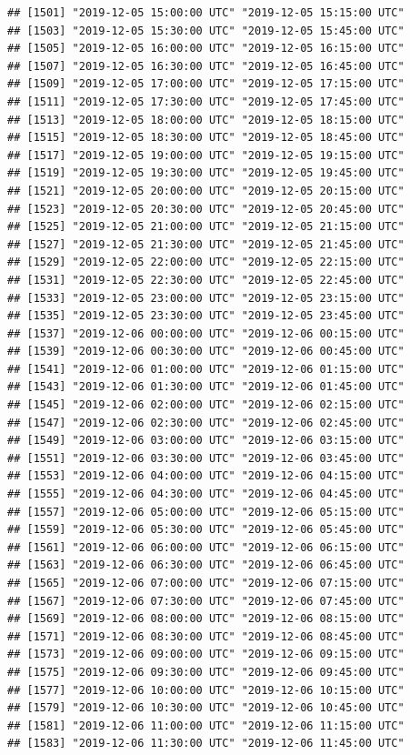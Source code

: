 \documentclass{article}\usepackage[]{graphicx}\usepackage[]{color}
\makeatletter
\newenvironment{kframe}{%
 \def\at@end@of@kframe{}%
 \ifinner\ifhmode%
  \def\at@end@of@kframe{\end{minipage}}%
  \begin{minipage}{\columnwidth}%
 \fi\fi%
 \def\FrameCommand##1{\hskip\@totalleftmargin \hskip-\fboxsep
 \colorbox{shadecolor}{##1}\hskip-\fboxsep
     \hskip-\linewidth \hskip-\@totalleftmargin \hskip\columnwidth}%
 \MakeFramed {\advance\hsize-\width
   \@totalleftmargin\z@ \linewidth\hsize
   \@setminipage}}%
 {\par\unskip\endMakeFramed%
 \at@end@of@kframe}
\newenvironment{knitrout}{}{} %
\makeatother
\begin{document}
\begin{knitrout}
\begin{kframe}
\begin{verbatim}
## [1501] "2019-12-05 15:00:00 UTC" "2019-12-05 15:15:00 UTC"
## [1503] "2019-12-05 15:30:00 UTC" "2019-12-05 15:45:00 UTC"
## [1505] "2019-12-05 16:00:00 UTC" "2019-12-05 16:15:00 UTC"
## [1507] "2019-12-05 16:30:00 UTC" "2019-12-05 16:45:00 UTC"
## [1509] "2019-12-05 17:00:00 UTC" "2019-12-05 17:15:00 UTC"
## [1511] "2019-12-05 17:30:00 UTC" "2019-12-05 17:45:00 UTC"
## [1513] "2019-12-05 18:00:00 UTC" "2019-12-05 18:15:00 UTC"
## [1515] "2019-12-05 18:30:00 UTC" "2019-12-05 18:45:00 UTC"
## [1517] "2019-12-05 19:00:00 UTC" "2019-12-05 19:15:00 UTC"
## [1519] "2019-12-05 19:30:00 UTC" "2019-12-05 19:45:00 UTC"
## [1521] "2019-12-05 20:00:00 UTC" "2019-12-05 20:15:00 UTC"
## [1523] "2019-12-05 20:30:00 UTC" "2019-12-05 20:45:00 UTC"
## [1525] "2019-12-05 21:00:00 UTC" "2019-12-05 21:15:00 UTC"
## [1527] "2019-12-05 21:30:00 UTC" "2019-12-05 21:45:00 UTC"
## [1529] "2019-12-05 22:00:00 UTC" "2019-12-05 22:15:00 UTC"
## [1531] "2019-12-05 22:30:00 UTC" "2019-12-05 22:45:00 UTC"
## [1533] "2019-12-05 23:00:00 UTC" "2019-12-05 23:15:00 UTC"
## [1535] "2019-12-05 23:30:00 UTC" "2019-12-05 23:45:00 UTC"
## [1537] "2019-12-06 00:00:00 UTC" "2019-12-06 00:15:00 UTC"
## [1539] "2019-12-06 00:30:00 UTC" "2019-12-06 00:45:00 UTC"
## [1541] "2019-12-06 01:00:00 UTC" "2019-12-06 01:15:00 UTC"
## [1543] "2019-12-06 01:30:00 UTC" "2019-12-06 01:45:00 UTC"
## [1545] "2019-12-06 02:00:00 UTC" "2019-12-06 02:15:00 UTC"
## [1547] "2019-12-06 02:30:00 UTC" "2019-12-06 02:45:00 UTC"
## [1549] "2019-12-06 03:00:00 UTC" "2019-12-06 03:15:00 UTC"
## [1551] "2019-12-06 03:30:00 UTC" "2019-12-06 03:45:00 UTC"
## [1553] "2019-12-06 04:00:00 UTC" "2019-12-06 04:15:00 UTC"
## [1555] "2019-12-06 04:30:00 UTC" "2019-12-06 04:45:00 UTC"
## [1557] "2019-12-06 05:00:00 UTC" "2019-12-06 05:15:00 UTC"
## [1559] "2019-12-06 05:30:00 UTC" "2019-12-06 05:45:00 UTC"
## [1561] "2019-12-06 06:00:00 UTC" "2019-12-06 06:15:00 UTC"
## [1563] "2019-12-06 06:30:00 UTC" "2019-12-06 06:45:00 UTC"
## [1565] "2019-12-06 07:00:00 UTC" "2019-12-06 07:15:00 UTC"
## [1567] "2019-12-06 07:30:00 UTC" "2019-12-06 07:45:00 UTC"
## [1569] "2019-12-06 08:00:00 UTC" "2019-12-06 08:15:00 UTC"
## [1571] "2019-12-06 08:30:00 UTC" "2019-12-06 08:45:00 UTC"
## [1573] "2019-12-06 09:00:00 UTC" "2019-12-06 09:15:00 UTC"
## [1575] "2019-12-06 09:30:00 UTC" "2019-12-06 09:45:00 UTC"
## [1577] "2019-12-06 10:00:00 UTC" "2019-12-06 10:15:00 UTC"
## [1579] "2019-12-06 10:30:00 UTC" "2019-12-06 10:45:00 UTC"
## [1581] "2019-12-06 11:00:00 UTC" "2019-12-06 11:15:00 UTC"
## [1583] "2019-12-06 11:30:00 UTC" "2019-12-06 11:45:00 UTC"

\end{verbatim}
\end{kframe}
\end{knitrout}
\end{document}
